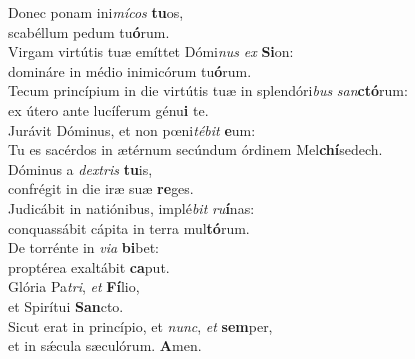 \evenverse Donec ponam ini\textit{mí}\textit{cos} \textbf{tu}os,~\*\\
\evenverse scabéllum pedum tu\textbf{ó}rum.\\
\oddverse Virgam virtútis tuæ emíttet Dómi\textit{nus} \textit{ex} \textbf{Si}on:~\*\\
\oddverse domináre in médio inimicórum tu\textbf{ó}rum.\\
\evenverse Tecum princípium in die virtútis tuæ in splendóri\textit{bus} \textit{san}\textbf{ctó}rum:~\*\\
\evenverse ex útero ante lucíferum génu\textbf{i} te.\\
\oddverse Jurávit Dóminus, et non pœni\textit{té}\textit{bit} \textbf{e}um:~\*\\
\oddverse Tu es sacérdos in ætérnum secúndum órdinem Mel\textbf{chí}sedech.\\
\evenverse Dóminus a \textit{dex}\textit{tris} \textbf{tu}is,~\*\\
\evenverse confrégit in die iræ suæ \textbf{re}ges.\\
\oddverse Judicábit in natiónibus, implé\textit{bit} \textit{ru}\textbf{í}nas:~\*\\
\oddverse conquassábit cápita in terra mul\textbf{tó}rum.\\
\evenverse De torrénte in \textit{vi}\textit{a} \textbf{bi}bet:~\*\\
\evenverse proptérea exaltábit \textbf{ca}put.\\
\oddverse Glória Pa\textit{tri}, \textit{et} \textbf{Fí}lio,~\*\\
\oddverse et Spirítui \textbf{San}cto.\\
\evenverse Sicut erat in princípio, et \textit{nunc}, \textit{et} \textbf{sem}per,~\*\\
\evenverse et in sǽcula sæculórum. \textbf{A}men.\\
